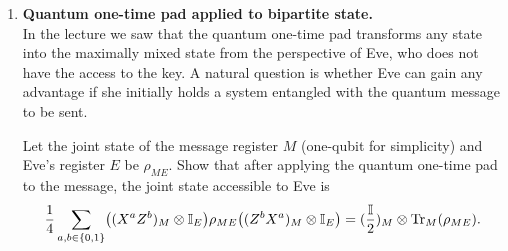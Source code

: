 \documentclass[12pt]{article}
\begin{document}
\begin{enumerate}
\item {\bf Quantum one-time pad applied to bipartite state.}\\
In the lecture we saw that the quantum one-time pad transforms any state into the maximally mixed state from the perspective of Eve, who does not have the access to the key. A natural question is whether Eve can gain any advantage if she initially holds a system entangled with the quantum message to be sent.

Let the joint state of the message register $M$ (one-qubit for simplicity) and Eve's register $E$ be $\rho_{ME}$. Show that after applying the quantum one-time pad to the message, the joint state accessible to Eve is
\begin{equation*}
\frac{1}{4}\sum_{a,b \in \{0, 1\}}\bigl((X^a Z^b)_M \otimes \mathbb{I}_E \bigr) \rho_{ME} \bigl((Z^bX^a)_M \otimes \mathbb{I}_E \bigr) = (\frac{\mathbb{I}}{2})_M \otimes \mathrm{Tr}_M (\rho_{ME}).
\end{equation*}
\end{enumerate}
\end{document}
